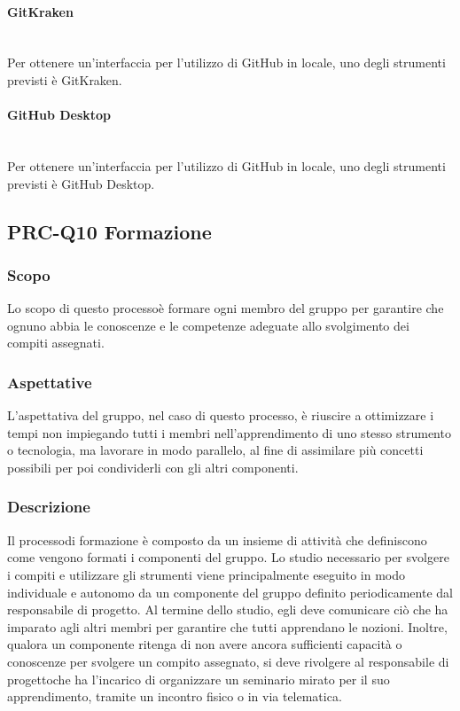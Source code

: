 			\paragraph{GitKraken} \mbox{}\\ [1mm]
				Per ottenere un'interfaccia per l'utilizzo di GitHub in locale, uno degli strumenti previsti è GitKraken.
			\paragraph{GitHub Desktop} \mbox{}\\ [1mm]
				Per ottenere un'interfaccia per l'utilizzo di GitHub in locale, uno degli strumenti previsti è GitHub Desktop.
	\subsection{PRC-Q10 Formazione}
		\subsubsection{Scopo}
			Lo scopo di questo processo\glosp è formare ogni membro del gruppo per garantire che ognuno abbia le conoscenze e le competenze adeguate allo svolgimento dei compiti assegnati.
		\subsubsection{Aspettative}
			L'aspettativa del gruppo, nel caso di questo processo\glo, è riuscire a ottimizzare i tempi non impiegando tutti i membri nell'apprendimento di uno stesso strumento o tecnologia, ma lavorare in modo parallelo, al fine di assimilare più concetti possibili per poi condividerli con gli altri componenti.
		\subsubsection{Descrizione}
			Il processo\glosp di formazione è composto da un insieme di attività che definiscono come vengono formati i componenti del gruppo.
			Lo studio necessario per svolgere i compiti e utilizzare gli strumenti viene principalmente eseguito in modo individuale e autonomo da un componente del gruppo definito periodicamente dal responsabile di progetto\glo. Al termine dello studio, egli deve comunicare ciò che ha imparato agli altri membri per garantire che tutti apprendano le nozioni.
			Inoltre, qualora un componente ritenga di non avere ancora sufficienti capacità o conoscenze per svolgere un compito assegnato, si deve rivolgere al responsabile di progetto\glosp che ha l'incarico di organizzare un seminario mirato per il suo apprendimento, tramite un incontro fisico o in via telematica.
